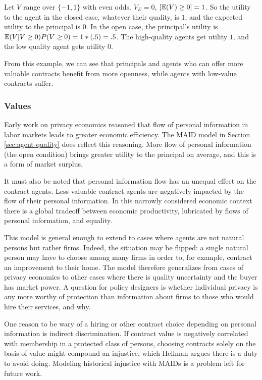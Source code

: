 \documentclass[../thesis.tex]{subfiles}
\begin{document}
\begin{exm}
  Let $V$ range over $\{-1,1\}$ with even odds.
    $V_E = 0$, $[\mathbb{E}(V) \geq 0] = 1$.
    So the utility to the agent in the closed case, whatever their quality,
    is $1$, and the expected utility to the principal is $0$.
    In the open case, the principal's utility is
    $\mathbb{E}(V \vert V \geq 0) P(V \geq 0) = 1 * (.5) = .5$.
    The high-quality agents get utility $1$, and the low
    quality agent gets utility $0$.
\end{exm}

From this example, we can see that principals and agents
who can offer more valuable contracts benefit from more
openness, while agents with low-value contracts suffer.


\subsubsection{Values}

Early work on privacy economics reasoned that
flow of personal information in labor markets
leads to greater economic efficiency. \cite{posner1981economics}
The MAID model in Section \ref{sec:agent-quality}
does reflect this reasoning.
More flow of personal information (the open condition)
brings greater utility to the principal
on average, and this is a form of market surplus.

It must also be noted that personal information flow
has an unequal effect on the contract agents.
Less valuable contract agents are negatively impacted
by the flow of their personal information.
In this narrowly considered economic context there 
is a global tradeoff between economic productivity,
lubricated by flows of personal information, and
equality.

This model is general enough to extend to cases where
agents are not natural persons but rather firms.
Indeed, the situation may be flipped: a single
natural person may have to choose among many firms
in order to, for example, contract an improvement to
their home.
The model therefore generalizes from cases of privacy
economics to other cases where there is quality uncertainty
and the buyer has market power.
A question for policy designers is whether individual
privacy is any more worthy of protection than
information about firms to those who would
hire their services, and why.

One reason to be wary of a hiring or other contract
choice depending on personal information is indirect
discrimination.
If contract value is negatively correlated with membership
in a protected class of persons, choosing contracts solely
on the basis of value might compound an injustice, which
Hellman argues there is a duty to avoid doing.
\cite{hellman2017indirect}
Modeling historical injustice with MAIDs is a problem
left for future work.
\end{document}

